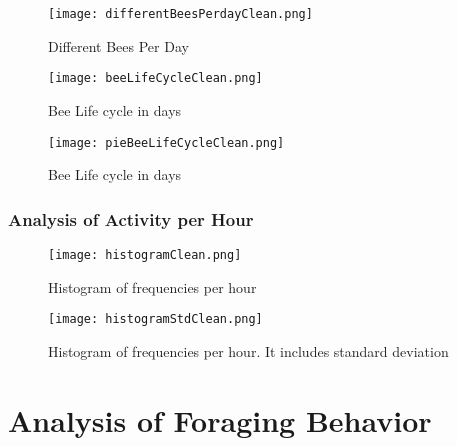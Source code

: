 \documentclass[11pt,fleqn]{book} %
\begin{document}
\begin{figure}[h!]%
\centering%
\texttt{[image: differentBeesPerdayClean.png]}%
\caption{Different Bees Per Day}%
\end{figure}

%


\begin{figure}[h!]%
\centering%
\texttt{[image: beeLifeCycleClean.png]}%
\caption{Bee Life cycle in days}%
\end{figure}

%


\begin{figure}[h!]%
\centering%
\texttt{[image: pieBeeLifeCycleClean.png]}%
\caption{Bee Life cycle in days}%
\end{figure}

%
\subsection{Analysis of Activity per Hour}%
\label{subsec:Analysis of Activity per Hour}%


\begin{figure}[h!]%
\centering%
\texttt{[image: histogramClean.png]}%
\caption{Histogram of frequencies per hour}%
\end{figure}

%


\begin{figure}[h!]%
\centering%
\texttt{[image: histogramStdClean.png]}%
\caption{Histogram of frequencies per hour. It includes standard deviation}%
\end{figure}

\chapter{Analysis of Foraging Behavior}
\end{document}

